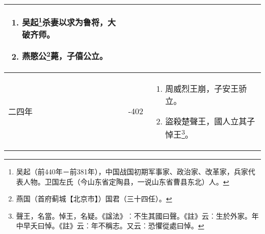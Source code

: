 \begin{longtable}{|>{\centering\scriptsize}m{2em}|>{\centering\scriptsize}m{1.3em}|>{\centering}m{8.8em}|}
\begin{enumerate}
  \item 吴起\footnote{吴起（前440年－前381年），中国战国初期军事家、政治家、改革家，兵家代表人物。卫国左氏（今山东省定陶县，一说山东省曹县东北）人。}杀妻以求为鲁将，大破齐师。
  \item 燕愍公\footnote{燕国（首府蓟城【北京市】）国君（三十四任）。}薨，子僖公立。
  \end{enumerate} \tabularnewline\hline
  二四年 & -402 & \begin{enumerate}
    \tiny
  \item 周威烈王崩，子安王骄立。
  \item 盜殺楚聲王，國人立其子悼王\footnote{聲王，名當。悼王，名疑。《諡法》︰不生其國曰聲。《註》云︰生於外家。年中早夭曰悼。《註》云︰年不稱志。又云︰恐懼從處曰悼。}。
  \end{enumerate} \tabularnewline
  \bottomrule
\end{longtable}

